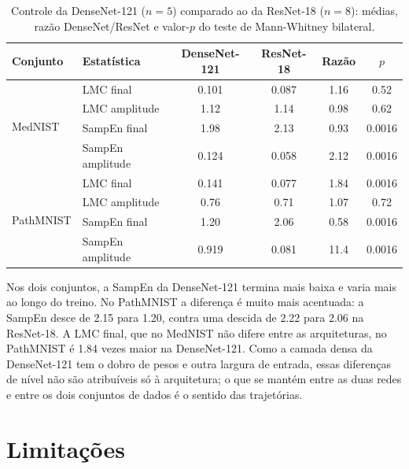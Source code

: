 \begin{table}[H]
  \centering
  \caption{Controle da DenseNet-121 ($n = 5$) comparado ao da ResNet-18
  ($n = 8$): médias, razão DenseNet/ResNet e valor-$p$ do teste de
  Mann-Whitney bilateral.}
  \label{tab:densenet}
  \footnotesize
  \begin{tabular}{llcccc}
    \toprule
    Conjunto & Estatística & DenseNet-121 & ResNet-18 & Razão & $p$ \\
    \midrule
    \multirow{4}{*}{MedNIST}
      & LMC final           & \num{0,101} & \num{0,087} & \num{1,16} & \num{0,52} \\
      & LMC amplitude       & \num{1,12}  & \num{1,14}  & \num{0,98} & \num{0,62} \\
      & SampEn final        & \num{1,98}  & \num{2,13}  & \num{0,93} & \num{0,0016} \\
      & SampEn amplitude    & \num{0,124} & \num{0,058} & \num{2,12} & \num{0,0016} \\
    \midrule
    \multirow{4}{*}{PathMNIST}
      & LMC final           & \num{0,141} & \num{0,077} & \num{1,84} & \num{0,0016} \\
      & LMC amplitude       & \num{0,76}  & \num{0,71}  & \num{1,07} & \num{0,72} \\
      & SampEn final        & \num{1,20}  & \num{2,06}  & \num{0,58} & \num{0,0016} \\
      & SampEn amplitude    & \num{0,919} & \num{0,081} & \num{11,4} & \num{0,0016} \\
    \bottomrule
  \end{tabular}
\end{table}

Nos dois conjuntos, a SampEn da DenseNet-121 termina mais baixa e varia mais
ao longo do treino. No PathMNIST a diferença é muito mais acentuada: a SampEn
desce de \num{2,15} para \num{1,20}, contra uma descida de \num{2,22} para
\num{2,06} na ResNet-18. A LMC final, que no MedNIST não difere entre as
arquiteturas, no PathMNIST é \num{1,84} vezes maior na DenseNet-121. Como a
camada densa da DenseNet-121 tem o dobro de pesos e outra largura de entrada,
essas diferenças de nível não são atribuíveis só à arquitetura; o que se
mantém entre as duas redes e entre os dois conjuntos de dados é o sentido das
trajetórias.

\section{Limitações}
\label{sec:res-limitacoes}

